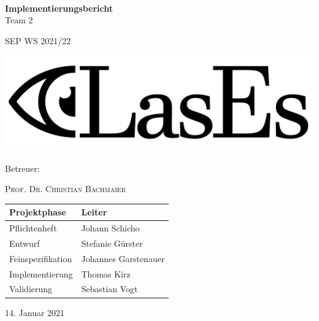 \documentclass[a4paper,11pt]{article}
\begin{document}
    \begin{titlepage}
        \centering

        $~$

        \vspace{0.2cm} %

        \Huge \textbf{Implementierungsbericht}\\

        \Huge Team 2
        \Large

        SEP WS 2021/22

        \vspace{2cm}

        \includegraphics[width=0.8\linewidth]{graphics/LasEs-logo}

        \vspace{2cm}

        Betreuer:

        \textsc{Prof. Dr. Christian Bachmaier}

        \vspace{1cm}

        \begin{table}[H]
            \centering
            \Large
            \begin{tabular}{ll}
                \toprule
                \textbf{Projektphase} & \textbf{Leiter} \\
                \midrule
                Pflichtenheft & Johann Schicho \\
                Entwurf & Stefanie Gürster \\
                Feinspezifikation & Johannes Garstenauer \\
                Implementierung & Thomas Kirz \\
                Validierung & Sebastian Vogt \\
                \bottomrule
            \end{tabular}
        \end{table}

        \vspace{1cm}

        14. Januar 2021

    \end{titlepage}
\end{document}
